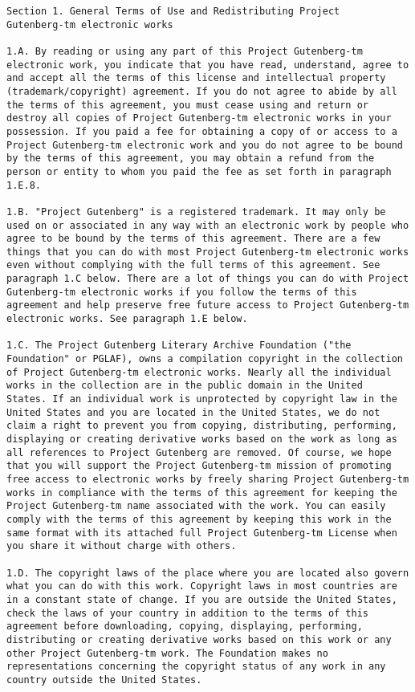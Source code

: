 \documentclass[oneside]{book}
\begin{document}
\begin{verbatim}
Section 1. General Terms of Use and Redistributing Project
Gutenberg-tm electronic works

1.A. By reading or using any part of this Project Gutenberg-tm
electronic work, you indicate that you have read, understand, agree to
and accept all the terms of this license and intellectual property
(trademark/copyright) agreement. If you do not agree to abide by all
the terms of this agreement, you must cease using and return or
destroy all copies of Project Gutenberg-tm electronic works in your
possession. If you paid a fee for obtaining a copy of or access to a
Project Gutenberg-tm electronic work and you do not agree to be bound
by the terms of this agreement, you may obtain a refund from the
person or entity to whom you paid the fee as set forth in paragraph
1.E.8.

1.B. "Project Gutenberg" is a registered trademark. It may only be
used on or associated in any way with an electronic work by people who
agree to be bound by the terms of this agreement. There are a few
things that you can do with most Project Gutenberg-tm electronic works
even without complying with the full terms of this agreement. See
paragraph 1.C below. There are a lot of things you can do with Project
Gutenberg-tm electronic works if you follow the terms of this
agreement and help preserve free future access to Project Gutenberg-tm
electronic works. See paragraph 1.E below.

1.C. The Project Gutenberg Literary Archive Foundation ("the
Foundation" or PGLAF), owns a compilation copyright in the collection
of Project Gutenberg-tm electronic works. Nearly all the individual
works in the collection are in the public domain in the United
States. If an individual work is unprotected by copyright law in the
United States and you are located in the United States, we do not
claim a right to prevent you from copying, distributing, performing,
displaying or creating derivative works based on the work as long as
all references to Project Gutenberg are removed. Of course, we hope
that you will support the Project Gutenberg-tm mission of promoting
free access to electronic works by freely sharing Project Gutenberg-tm
works in compliance with the terms of this agreement for keeping the
Project Gutenberg-tm name associated with the work. You can easily
comply with the terms of this agreement by keeping this work in the
same format with its attached full Project Gutenberg-tm License when
you share it without charge with others.

1.D. The copyright laws of the place where you are located also govern
what you can do with this work. Copyright laws in most countries are
in a constant state of change. If you are outside the United States,
check the laws of your country in addition to the terms of this
agreement before downloading, copying, displaying, performing,
distributing or creating derivative works based on this work or any
other Project Gutenberg-tm work. The Foundation makes no
representations concerning the copyright status of any work in any
country outside the United States.


\end{verbatim}
\end{document}
